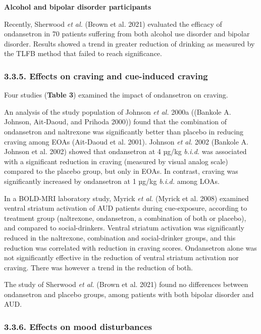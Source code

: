 \documentclass[
  12pt,
]{article}
\begin{document}
\textbf{Alcohol and bipolar disorder participants}

Recently, Sherwood \emph{et al.} (Brown et al. 2021) evaluated the
efficacy of ondansetron in 70 patients suffering from both alcohol use
disorder and bipolar disorder. Results showed a trend in greater
reduction of drinking as measured by the TLFB method that failed to
reach significance.

\subsubsection{3.3.5. Effects on craving and cue-induced
craving}\label{effects-on-craving-and-cue-induced-craving}

Four studies (\textbf{Table 3}) examined the impact of ondansetron on
craving.

An analysis of the study population of Johnson \emph{et al.} 2000a
((Bankole A. Johnson, Ait‐Daoud, and Prihoda 2000)) found that the
combination of ondansetron and naltrexone was significantly better than
placebo in reducing craving among EOAs (Ait-Daoud et al. 2001). Johnson
\emph{et al.} 2002 (Bankole A. Johnson et al. 2002) showed that
ondansetron at 4 µg/kg \emph{b.i.d.} was associated with a significant
reduction in craving (measured by visual analog scale) compared to the
placebo group, but only in EOAs. In contrast, craving was significantly
increased by ondansetron at 1 µg/kg \emph{b.i.d.} among LOAs.

In a BOLD-MRI laboratory study, Myrick \emph{et al.} (Myrick et al.
2008) examined ventral striatum activation of AUD patients during
cue-exposure, according to treatment group (naltrexone, ondansetron, a
combination of both or placebo), and compared to social-drinkers.
Ventral striatum activation was significantly reduced in the naltrexone,
combination and social-drinker groups, and this reduction was correlated
with reduction in craving scores. Ondansetron alone was not
significantly effective in the reduction of ventral striatum activation
nor craving. There was however a trend in the reduction of both.

The study of Sherwood \emph{et al.} (Brown et al. 2021) found no
differences between ondansetron and placebo groups, among patients with
both bipolar disorder and AUD.

\subsubsection{3.3.6. Effects on mood
disturbances}\label{effects-on-mood-disturbances}
\end{document}
